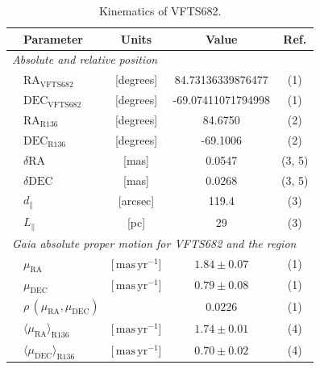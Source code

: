 \documentclass[a4paper,fleqn,usenatbib]{mnras}
\newcommand{\masyr}{\,\mathrm{mas}\,\mathrm{yr}^{-1}}
\begin{document}
\begin{table}
  \begin{center}
    \caption{Kinematics of VFTS682.}
    \vspace*{-9pt}
    \begin{tabular}{llc|c|c}
      \hline
      \hline
      &Parameter & Units & Value & Ref.\\
      \hline
      \multicolumn{5}{l}{\emph{Absolute and relative position}} \\
      \hline
         &$\mathrm{RA}_\mathrm{VFTS682}$&[degrees] & \phantom{-0}84.73136339876477 
                     & (1) \\        
               &$\mathrm{DEC}_\mathrm{VFTS682}$&[degrees] &
                                                            \phantom{0}-69.07411071794998
                     & (1)  \\    
                                                     
                        &$\mathrm{RA}_\mathrm{R136}$&[degrees] & \phantom{00}84.6750
                     &  (2) \\        
               &$     \mathrm{DEC}_\mathrm{R136}$&[degrees] &  \phantom{0}-69.1006
                     &  (2) \\       
        &$      \delta\mathrm{RA}$  &[mas] & \phantom{-00}0.0547                      
        &  (3, 5)
  \\        
               &$     \delta\mathrm{DEC}$  &[mas] & \phantom{-00}0.0268 
                     &  (3, 5) \\  
                       &$  d_\parallel$  & [arcsec]
                         & 119.4
                                 &  (3) \\
      &$L_\parallel$ & [pc] & 29 & (3) \\
      
                          
                     \hline
           \multicolumn{5}{l}{\emph{Gaia absolute proper motion for VFTS682
      and the region}} \\
      \hline
          &$\mu_\mathrm{RA}$&[$\masyr$] & $1.84\pm 0.07$
                     & (1) \\        
               &$\mu_\mathrm{DEC}$&[$\masyr$] & $0.79\pm 0.08$
                     &  (1) \\        
                 & $\rho\,(\mu_\mathrm{RA}, \mu_\mathrm{DEC})$ &  & $0.0226$
                        & (1)  \\         
       &$\langle\mu_\mathrm{RA}\rangle_\mathrm{R136}$&[$\masyr$] & $1.74\pm0.01$
                        & (4) \\
      &$\langle\mu_\mathrm{DEC}\rangle_\mathrm{R136}$&[$\masyr$]
                & $0.70\pm0.02$ &  (4)\\
\hline
      

\end{tabular}
\end{center}
\end{table}
\end{document}
